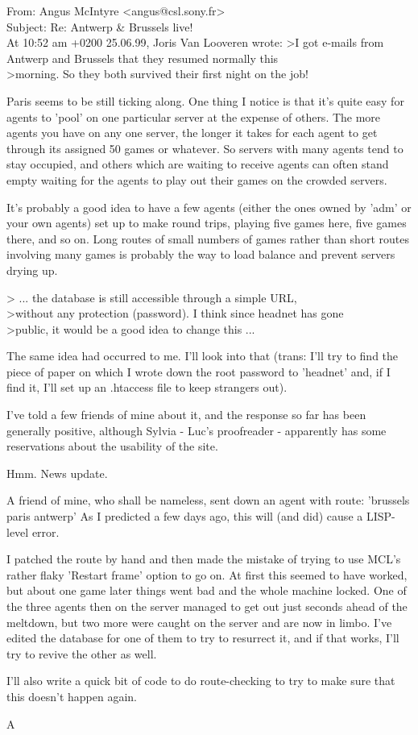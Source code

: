 \begin{mail}
From: Angus McIntyre <angus@csl.sony.fr>\\
Subject: Re: Antwerp \& Brussels live!\\

At 10:52 am +0200 25.06.99, Joris Van Looveren wrote:
>I got e-mails from Antwerp and Brussels that they resumed normally this
\\>morning. So they both survived their first night on the job!

Paris seems to be still ticking along. One thing I notice is that it's 
quite easy for agents to 'pool' on one particular server at the expense 
of others. The more agents you have on any one server, the longer it 
takes for each agent to get through its assigned 50 games or whatever. 
So servers with many agents tend to stay occupied, and others which are 
waiting to receive agents can often stand empty waiting for the agents 
to play out their games on the crowded servers.

It's probably a good idea to have a few agents (either the ones owned 
by 'adm' or your own agents) set up to make round trips, playing five 
games here, five games there, and so on. Long routes of small numbers 
of games rather than short routes involving many games is probably 
the way to load balance and prevent servers drying up.

> ... the database is still accessible through a simple URL,
\\>without any protection (password). I think since headnet has gone
\\>public, it would be a good idea to change this ...

The same idea had occurred to me. I'll look into that (trans: I'll 
try to find the piece of paper on which I wrote down the root password 
to 'headnet' and, if I find it, I'll set up an .htaccess 
file to keep strangers out).

I've told a few friends of mine about it, and the response 
so far has been generally positive, although Sylvia - Luc's 
proofreader - apparently has some reservations about the 
usability of the site.

Hmm. News update.

A friend of mine, who shall be nameless, sent down an agent with route:
	'brussels paris antwerp'
As I predicted a few days ago, this will (and did) cause a 
LISP-level error.

I patched the route by hand and then made the mistake of trying to use 
MCL's rather flaky 'Restart frame' option to go on. At first this seemed 
to have worked, but about one game later things went bad and the whole 
machine locked. One of the three agents then on the server managed to 
get out just seconds ahead of the meltdown, but two more were caught 
on the server and are now in limbo. I've edited the database for one 
of them to try to resurrect it, and if that works, I'll try to 
revive the other as well.

I'll also write a quick bit of code to do route-checking to try 
to make sure that this doesn't happen again.

	A
\end{mail}


